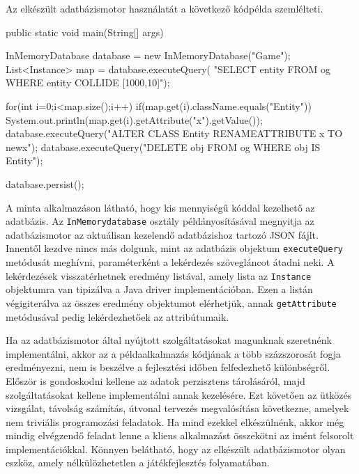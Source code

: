 
Az elkészült adatbázismotor használatát a következő kódpélda szemlélteti.

\begin{java}
public static void main(String[] args) {
   InMemoryDatabase database = new InMemoryDatabase("Game");
   List<Instance> map = database.executeQuery(
           "SELECT entity FROM og WHERE entity COLLIDE [1000,10]");

   for(int i=0;i<map.size();i++){
       if(map.get(i).className.equals("Entity")){
           System.out.println(map.get(i).getAttribute("x").getValue());
       }
   }
   database.executeQuery("ALTER CLASS Entity RENAMEATTRIBUTE x TO newx");
   database.executeQuery("DELETE obj FROM og WHERE obj IS Entity");

   database.persist();
}
\end{java}
	
A minta alkalmazáson látható, hogy kis mennyiségű kóddal kezelhető az adatbázis. Az \texttt{InMemorydatabase} osztály példányosításával megnyitja az adatbázismotor az aktuálisan kezelendő adatbázishoz tartozó JSON fájlt. Innentől kezdve nincs más dolgunk, mint az adatbázis objektum \texttt{executeQuery} metódusát meghívni, paraméterként a lekérdezés szövegláncot átadni neki. A lekérdezések visszatérhetnek eredmény listával, amely lista az \texttt{Instance} objektumra van tipizálva a Java driver implementációban. Ezen a listán végigiterálva az összes eredmény objektumot elérhetjük, annak \texttt{getAttribute} metódusával pedig lekérdezhetőek az attribútumaik.

Ha az adatbázismotor által nyújtott szolgáltatásokat magunknak szeretnénk implementálni, akkor az a példaalkalmazás kódjának a több százszorosát fogja eredményezni, nem is beszélve a fejlesztési időben felfedezhető különbségről. 
Először is gondoskodni kellene az adatok perzisztens tárolásáról, majd szolgáltatásokat kellene implementálni annak kezelésére. Ezt követően az ütközés vizsgálat, távolság számítás, útvonal tervezés megvalósítása következne, amelyek nem triviális programozási feladatok. Ha mind ezekkel elkészülnénk, akkor még mindig elvégzendő feladat lenne a kliens alkalmazást összekötni az imént felsorolt implementációkkal. Könnyen belátható, hogy az elkészült adatbázismotor olyan eszköz, amely nélkülözhetetlen a játékfejlesztés folyamatában.
